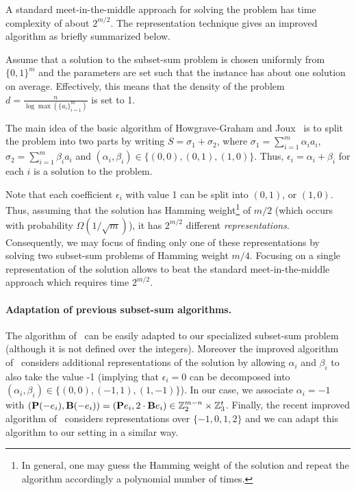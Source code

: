 A standard meet-in-the-middle approach for solving the problem has time complexity of about $2^{m/2}$.
The representation technique gives an improved algorithm as briefly summarized below.

Assume that a solution to the subset-sum problem is chosen uniformly from $\{0,1\}^m$
and the parameters are set such that the instance has about one solution on average. Effectively, this means that the density of the problem $d = \tfrac{n}{\log \max(\{a_i\}_{i=1}^{m})}$ is set to 1.

The main idea of the basic algorithm of Howgrave{-}Graham and Joux~\cite{Howgrave-GrahamJ10}
is to split the problem into two parts by writing
$S = \sigma_1 + \sigma_2$,
where $\sigma_1 = \sum_{i=1}^{m} \alpha_i a_i$, $\sigma_2 = \sum_{i=1}^{m} \beta_i a_i$
and $(\alpha_i,\beta_i) \in \{(0,0),(0,1),(1,0)\}$.
Thus, $\epsilon_i = \alpha_i + \beta_i$ for each $i$ is a solution to the problem.

Note that each coefficient $\epsilon_i$ with value 1 can be split into $(0,1)$, or $(1,0)$.
Thus, assuming that the solution has Hamming weight\footnote{In general, one
may guess the Hamming weight of the solution and
repeat the algorithm accordingly a polynomial number of times.} of $m/2$
(which occurs with probability $\Omega(1/\sqrt{m})$),
it has $2^{m/2}$ different \emph{representations}.
Consequently, we may focus of finding only one of these representations
by solving two subset-sum problems of Hamming weight $m/4$.
Focusing on a single representation of the solution
allows to beat the standard meet-in-the-middle approach which requires time $2^{m/2}$.

\paragraph{Adaptation of previous subset-sum algorithms.}
The algorithm of~\cite{Howgrave-GrahamJ10} can be easily adapted
to our specialized subset-sum problem (although it is not defined over the integers).
Moreover the improved algorithm of~\cite{BeckerCJ11} considers additional representations
of the solution by allowing $\alpha_i$ and $\beta_i$ to also take the value -1
(implying that $\epsilon_i = 0$ can be decomposed into
$(\alpha_i,\beta_i) \in \{(0,0),(-1,1),(1,-1)\}$).
In our case, we associate $\alpha_i = -1$
with $(\mat{P}(-e_i), \mat{B}(-e_i)) = (\mat{P}e_i, 2 \cdot \mat{B}e_i)  \in \Z_2^{m-n} \times \Z_3^t$.
Finally, the recent improved algorithm of~\cite{BonnetainBSS20} considers representations over
$\{-1,0,1,2\}$ and we can adapt this algorithm to our setting in a similar way.

